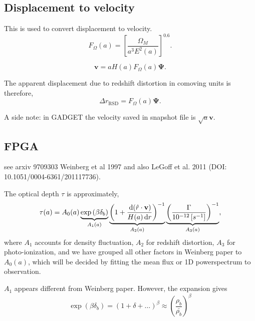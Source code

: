 \documentclass{paper}
\begin{document}
\subsection{Displacement to velocity}
This is used to convert displacement to velocity. 
\[
    F_\Omega(a) = \left[\frac{\Omega_M}{a^3 E^2(a)}\right]^{0.6} .
\]

\[
    \mathbf{v} = a H(a) F_\Omega(a) \mathbf{\Psi} .
\]

The apparent displacement due to redshift distortion in
comoving units is therefore,
\[
    \Delta r_\mathrm{RSD} = F_\Omega(a) \mathbf{\Psi} .
\]

A side note: in GADGET the velocity saved in snapshot file is 
$\sqrt{a}\mathbf{v}$.

\subsection{FPGA}
see arxiv 9709303 Weinberg et al 1997 and also  LeGoff et
al. 2011 (DOI: 10.1051/0004-6361/201117736).

The optical depth $\tau$ is approximately,
\[  \tau(a) = 
    A_0(a)
    \underbrace{
        \exp \left(\beta \delta_b \right)
    }_{A_1(a)}
    \underbrace{
        \left(1 + 
        \frac{\diff ( \hat{r} \cdot \mathbf{v})}
        {H(a) \diff r } \right)^{-1}
    }_{A_2(a)}
    \underbrace{
        \left(\frac{\Gamma}{\unit[10^{-12}][s^{-1}]}
        \right)^{-1}
    }_{A_3(a)}
    ,
\] where $A_1$ accounts for density fluctuation, 
         $A_2$ for redshift distortion, 
         $A_3$ for photo-ionization, 
   and we have grouped all other factors in Weinberg paper to $A_0(a)$, 
   which will be decided by fitting the mean flux or 1D
   powerspectrum to observation.

   $A_1$ appears different from Weinberg paper. However, the
   expansion gives
   \[ 
     \exp \left( \beta \delta_b \right)
     = (1 + \delta + \dots)^\beta
     \approx \left(\frac{\rho_b}{\bar{\rho_b}}\right)^\beta
   \]
\end{document}
